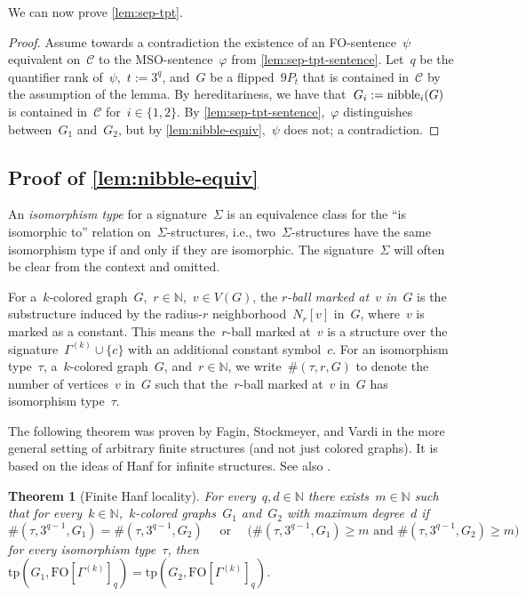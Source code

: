 \documentclass[11pt]{article}      \usepackage[margin=1in]{geometry}  \usepackage{microtype}
\newtheorem{theorem}{Theorem}[section]
\theoremstyle{definition}
\newcommand{\N}[0]{\mathrm{\mathbb{N}}}
\newcommand{\tp}{\mathrm{tp}}
\renewcommand{\phi}{\varphi}
\newcommand{\FO}{\mathrm{FO}}
\newcommand{\CC}{\mathcal{C}}
\renewcommand{\ge}{\geqslant}
\renewcommand{\geq}{\ge}
\begin{document}
We can now prove \cref{lem:sep-tpt}.
\lemSepTpt*
\begin{proof}
    Assume towards a contradiction the existence of an FO-sentence~$\psi$ equivalent on~$\CC$ to the MSO-sentence~$\phi$ from \cref{lem:sep-tpt-sentence}. 
    Let~$q$ be the quantifier rank of~$\psi$,~$t := 3^q$,
    and~$G$ be a flipped~$9P_t$ that is contained in~$\CC$ by the assumption of the lemma.
    By hereditariness, we have that~$G_i := \mathrm{nibble}_i(G)$ is contained in~$\CC$ for~$i\in\{1,2\}$.
    By \cref{lem:sep-tpt-sentence},~$\phi$ distinguishes between~$G_1$ and~$G_2$, but by \cref{lem:nibble-equiv},~$\psi$ does not; a contradiction.
\end{proof}

\subsection{Proof of \texorpdfstring{\cref{lem:nibble-equiv}}{lem:nibble-equiv}}\label{sec:nibble-equiv}
An \emph{isomorphism type} for a signature~$\Sigma$ is an equivalence class for the ``is isomorphic to'' relation on~$\Sigma$-structures, i.e., two~$\Sigma$-structures have the same isomorphism type if and only if they are isomorphic.
The signature~$\Sigma$ will often be clear from the context and omitted.

For a~$k$-colored graph~$G$,~$r\in \N$,~$v\in V(G)$, the \emph{$r$-ball marked at~$v$ in~$G$} is the substructure induced by the radius-$r$ neighborhood~$N_r[v]$ in~$G$, where~$v$ is marked as a constant.
This means the~$r$-ball marked at~$v$ is a structure over the signature~$\Gamma^{(k)} \cup \{c\}$ with an additional constant symbol~$c$.
For an isomorphism type~$\tau$, a~$k$-colored graph~$G$, and~$r\in\N$, we write~$\#(\tau,r,G)$ to denote the number of vertices~$v$ in~$G$ such that the~$r$-ball marked at~$v$ in~$G$ has isomorphism type~$\tau$.

The following theorem was proven by Fagin, Stockmeyer, and Vardi \cite[Thm.\ 4.3]{FAGIN199578} in the more general setting of arbitrary finite structures (and not just colored graphs).
It is based on the ideas of Hanf \cite{HANF2014132} for infinite structures.
See also \cite[Thm.\ 4.24]{libkin2004elements}.



\begin{theorem}[Finite Hanf locality]
    For every~$q,d \in \N$ there exists~$m\in\N$ such that for every~$k\in\N$,~$k$-colored graphs~$G_1$ and~$G_2$ with maximum degree~$d$ if 
    \[
        \#(\tau,3^{q-1},G_1) = \#(\tau,3^{q-1},G_2)
        \quad \text{ or } \quad
        \big(
            \#(\tau,3^{q-1},G_1)\geq m  \text{ and }\#(\tau,3^{q-1},G_2) \geq m    
        \big)
    \]
    for every isomorphism type~$\tau$, then 
   ~$\tp(G_1,\FO[\Gamma^{(k)}]_q) = \tp(G_2,\FO[\Gamma^{(k)}]_q)$.
\end{theorem}
\end{document}
